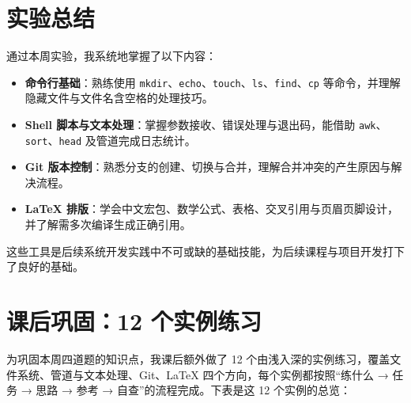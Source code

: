 \documentclass[a4paper, 12pt]{article}
\begin{document}
\section{实验总结}

通过本周实验，我系统地掌握了以下内容：

\begin{itemize}
  \item \textbf{命令行基础}：熟练使用 \texttt{mkdir}、\texttt{echo}、\texttt{touch}、\texttt{ls}、\texttt{find}、\texttt{cp} 等命令，并理解隐藏文件与文件名含空格的处理技巧。
  \item \textbf{Shell 脚本与文本处理}：掌握参数接收、错误处理与退出码，能借助 \texttt{awk}、\texttt{sort}、\texttt{head} 及管道完成日志统计。
  \item \textbf{Git 版本控制}：熟悉分支的创建、切换与合并，理解合并冲突的产生原因与解决流程。
  \item \textbf{\LaTeX{} 排版}：学会中文宏包、数学公式、表格、交叉引用与页眉页脚设计，并了解需多次编译生成正确引用。
\end{itemize}

这些工具是后续系统开发实践中不可或缺的基础技能，为后续课程与项目开发打下了良好的基础。

\section{课后巩固：12 个实例练习}

为巩固本周四道题的知识点，我课后额外做了 12 个由浅入深的实例练习，覆盖文件系统、管道与文本处理、Git、\LaTeX{} 四个方向，每个实例都按照“练什么 → 任务 → 思路 → 参考 → 自查”的流程完成。下表是这 12 个实例的总览：
\end{document}
